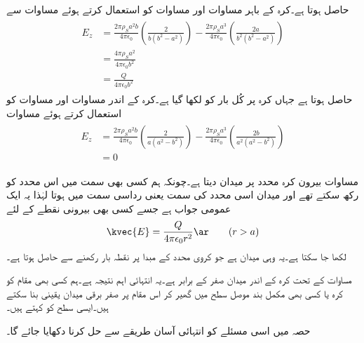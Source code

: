 حاصل ہوتا ہے۔کرہ کے باہر مساوات  اور مساوات   کو استعمال کرتے ہوئے مساوات  سے
\begin{gather}
\begin{aligned}\label{مساوات_کولمب_کرہ_بار_کا_میدان_ب}
E_z&=\frac{2 \pi\rho_S a^2 b}{4 \pi \epsilon_0} \left(\frac{2}{b(b^2-a^2)}\right)-\frac{2 \pi\rho_S a^3}{4 \pi \epsilon_0} \left(\frac{2a}{b^2(b^2-a^2)}\right)\\
&=\frac{4 \pi \rho_S a^2}{4\pi \epsilon_0 b^2}\\
&=\frac{Q}{4\pi \epsilon_0 b^2}
\end{aligned}
\end{gather}
حاصل ہوتا ہے جہاں  کرہ پر کُل بار  کو  لکھا گیا ہے۔کرہ کے اندر مساوات  اور مساوات   کو استعمال کرتے ہوئے مساوات 
\begin{gather}
\begin{aligned}\label{مساوات_کولمب_کرہ_بار_کا_میدان_پ}
E_z&=\frac{2 \pi\rho_S a^2 b}{4 \pi \epsilon_0} \left(\frac{2}{a(a^2-b^2)}\right)-\frac{2 \pi\rho_S a^3}{4 \pi \epsilon_0} \left(\frac{2b}{a^2(a^2-b^2)}\right)\\
&=0
\end{aligned}
\end{gather}

مساوات  بیرون کرہ  محدد پر میدان دیتا ہے۔چونکہ ہم کسی بھی سمت میں اس محدد کو رکھ سکتے تھے اور میدان اسی محدد کی سمت یعنی رداسی سمت میں ہوتا  لہٰذا یہ ایک عمومی جواب ہے جسے کسی بھی بیرونی نقطے کے لئے
\begin{align}
\kvec{E}=\frac{Q}{4\pi \epsilon_0 r^2} \ar  \quad \quad (r>a)
\end{align}
لکھا جا سکتا ہے۔یہ وہی میدان ہے جو کروی محدد کے مبدا پر  نقطہ بار رکھنے سے حاصل ہوتا ہے۔

مساوات  کے تحت کرہ کے اندر میدان صفر کے برابر ہے۔یہ انتہائی اہم نتیجہ ہے۔ہم کسی بھی مقام کو کرہ یا کسی بھی مکمل بند موصل سطح میں گھیر کر اس مقام پر صفر برقی میدان یقینی بنا سکتے ہیں۔ایسی سطح کو  کہتے ہیں۔

حصہ  میں اسی مسئلے کو انتہائی آسان طریقے سے حل کرنا دکھایا جائے گا۔

